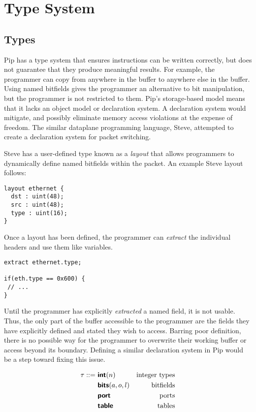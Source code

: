 
\section{Type System}

\subsection{Types}

Pip has a type system that ensures instructions can be written correctly, but does not guarantee that they produce meaningful results. For example, the programmer can copy from anywhere in the buffer to anywhere else in the buffer. Using named bitfields gives the programmer an alternative to bit manipulation, but the programmer is not restricted to them. Pip's storage-based model means that it lacks an object model or declaration system. A declaration system would mitigate, and possibly eliminate memory access violations at the expense of freedom. The similar dataplane programming language, Steve, attempted to create a declaration system for packet switching.

Steve has a user-defined type known as a \textit{layout} that allows programmers to dynamically define named bitfields within the packet. An example Steve layout follows:
\begin{verbatim}
layout ethernet {
  dst : uint(48);
  src : uint(48);
  type : uint(16);
}
\end{verbatim}
Once a layout has been defined, the programmer can \textit{extract} the individual headers and use them like variables.
\begin{verbatim}
extract ethernet.type;

if(eth.type == 0x600) {
 // ...
}
\end{verbatim}
Until the programmer has explicitly \textit{extracted} a named field, it is not usable. Thus, the only part of the buffer accessible to the programmer are the fields they have explicitly defined and stated they wish to access. Barring poor definition, there is no possible way for the programmer to overwrite their working buffer or access beyond its boundary. Defining a similar declaration system in Pip would be a step toward fixing this issue.

\begin{align*}
\tau ::=~& \bm{\mathsf{{int}}}(n)        & \text{integer types} \\
         & \bm{\mathsf{{bits}}}(a, o, l) & \text{bitfields} \\
         & \bm{\mathsf{{port}}}          & \text{ports} \\
         & \bm{\mathsf{{table}}}         & \text{tables} \\
\end{align*}

